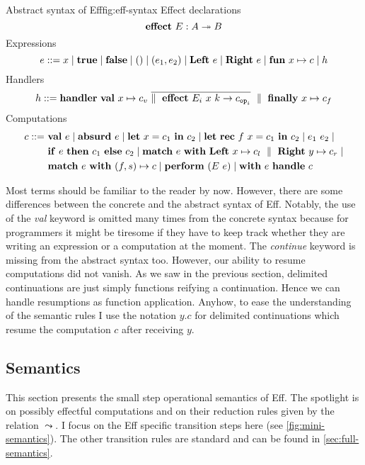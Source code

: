 \documentclass[class=article, crop=false]{standalone}
\begin{document}
\begin{myfigure}[.9]{Abstract syntax of Eff}{fig:eff-syntax}
Effect declarations
$$ \mathbf{effect}\  E : A \twoheadrightarrow B $$
%
Expressions
$$ e ::= x \mid
  \mathbf{true} \mid
  \mathbf{false} \mid
  () \mid
  (e_1, e_2) \mid
  \mathbf{Left}\  e \mid
  \mathbf{Right\ } e \mid
  \mathbf{fun}\  x \mapsto c \mid
  h $$
%
Handlers
$$ h ::= \mathbf{handler}\  \mathbf{val}\  x \mapsto c_v\ \overline{\parallel \ \mathbf{effect}\  E_i\ x\ k \to c_{\mathtt{op}_i} } \ \parallel \  \mathbf{finally}\  x \mapsto c_f $$
%
Computations
\begin{align*}
  c ::= \ &\mathbf{val}\  e \mid \mathbf{absurd}\  e \mid
    \mathbf{let}\  x = c_1 \ \mathbf{in}\  c_2 \mid
    \mathbf{let}\  \mathbf{rec}\  f\ x = c_1 \ \mathbf{in}\  c_2 \mid e_1\ e_2 \mid \\
    & \mathbf{if}\  e \ \mathbf{then}\  c_1 \ \mathbf{else}\  c_2 \mid
    \mathbf{match}\  e\ \mathbf{with}\  \mathbf{Left}\  x \mapsto c_l \ \parallel \  \mathbf{Right\ } y \mapsto c_r \mid\\
    & \mathbf{match}\  e\ \mathbf{with}\  (f, s) \mapsto c \mid \mathbf{perform}\  (E\ e) \mid
    \mathbf{with}\  e \ \mathbf{handle}\  c
\end{align*}
\end{myfigure}

Most terms should be familiar to the reader by now. However, there are some
differences between the concrete and the abstract syntax of Eff. Notably, the
use of the \emph{val} keyword is omitted many times from the concrete syntax
because for programmers it might be tiresome if they have to keep track whether
they are writing an expression or a computation at the moment. The
\emph{continue} keyword is missing from the abstract syntax too. However, our
ability to resume computations did not vanish. As we saw in the previous section,
delimited continuations are just simply functions reifying a continuation. Hence
we can handle resumptions as function application. Anyhow, to ease the
understanding of the semantic rules I use the notation $y.c$ for delimited
continuations which resume the computation $c$ after receiving $y$.

\subsection{Semantics}

This section presents the small step operational semantics of Eff. The spotlight
is on possibly effectful computations and on their reduction rules given by the
relation $\leadsto$. I focus on the Eff specific transition steps here (see
\autoref{fig:mini-semantics}). The other transition rules are standard and can
be found in \autoref{sec:full-semantics}.
\end{document}
